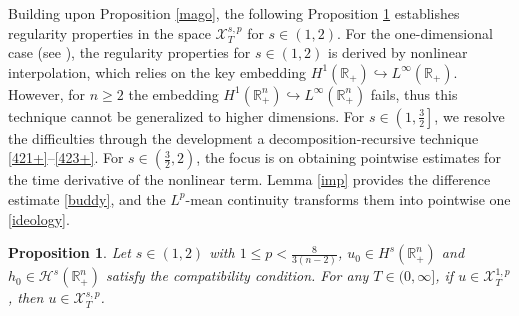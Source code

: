 \documentclass[preprint,compress,12pt]{elsarticle}
\newtheorem{proposition}[theorem]{Proposition}
\numberwithin{equation}{section}
\begin{document}
Building upon Proposition \ref{mago}, the following Proposition \ref{zealous1}  establishes regularity properties in the space \(\mathscr{X}^{s,p}_{T}\) for \(s \in (1, 2)\). For the one-dimensional case (see \cite{figment}), the regularity properties for $s\in(1,2)$ is derived by nonlinear interpolation, which relies on the key embedding $H^{1}(\mathbb{R}_{+})\hookrightarrow L^{\infty}(\mathbb{R}_{+})$. However, for $n\geq2$ the embedding $H^{1}(\mathbb{R}_{+}^{n})\hookrightarrow L^{\infty}(\mathbb{R}_{+}^{n})$ fails,  thus this technique cannot be  generalized to higher dimensions.
For $s \in \left(1,\frac{3}{2}\right]$, we resolve the difficulties through the development a decomposition-recursive technique \eqref{421+}--\eqref{423+}. For $s \in \left(\frac{3}{2},2\right)$, the focus is on obtaining pointwise estimates for the time derivative of the nonlinear term. Lemma \ref{imp} provides the difference estimate \eqref{buddy}, and the $L^{p}$-mean continuity transforms them into pointwise one \eqref{ideology}.
\begin{proposition}\label{zealous1}
	Let $s \in (1,2)$ with $1 \leq p < \frac{8}{3(n-2)}$,
	$u_{0}\in H^{s}(\mathbb{R}^{n}_{+})$ and $h_{0}\in \mathcal{H}^{s}(\mathbb{R}_{+}^{n})$ satisfy the compatibility condition. For any $T \in (0,\infty]$, if $u\in\mathscr{X}^{1,p}_T$, then $u \in \mathscr{X}^{s,p}_T$.
\end{proposition}
\end{document}
